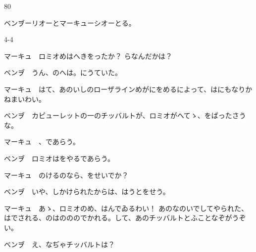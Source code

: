 \documentclass[tate,paper=b6j,jafontsize=9pt]{jlreq}
\begin{document}
\begin{azconvIndented}{8\zw}{0\zw}

ベンヺーリオーとマーキューシオーとる。

\end{azconvIndented}
\begin{azconvIndented}{4\zw}{-4\zw}

マーキュ　ロミオめはへきをったか？ らなんだかは？

ベンヺ　うん、のへは。にうていた。

マーキュ　はて、あのいしのローザラインめがにをめるによって、はにもなりかねまいわい。

ベンヺ　カピューレットの一のチッバルトが、ロミオがへてゝ、をばったさうな。

マーキュ　、であらう。

ベンヺ　ロミオはをやるであらう。

マーキュ　のけるのなら、をせいでか？

ベンヺ　いや、しかけられたからは、はうとをせう。

マーキュ　あゝ、ロミオのめ、はんでゐるわい！ あのなのいでしてやられた、はでされる、のはのののでかれる。して、あのチッバルトとふことなぞがうぞい。

ベンヺ　え、なぢゃチッバルトは？


\end{azconvIndented}
\end{document}
